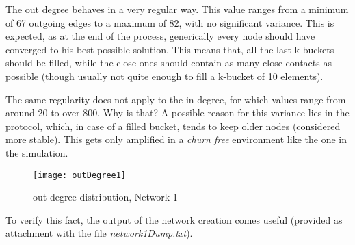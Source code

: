 \documentclass[11pt, a4paper]{report}
\begin{document}
	\par
	The out degree behaves in a very regular way. This value ranges from a minimum of 67 outgoing edges to a maximum of 82, with no significant variance. This is expected, as at the end of the process, generically every node should have converged to his best possible solution. This means that, all the last k-buckets should be filled, while the close ones should contain as many close contacts as possible (though usually not quite enough to fill a k-bucket of 10 elements).
	\par
	The same regularity does not apply to the in-degree, for which values range from around 20 to over 800. Why is that? A possible reason for this variance lies in the protocol, which, in case of a filled bucket, tends to keep older nodes (considered more stable). This gets only amplified in a \emph{churn free} environment like the one in the simulation.
	\begin{figure}[H]
		\centering
		\texttt{[image: outDegree1]}
		\caption{out-degree distribution, Network 1}
		\label{fig:outDegree1}
	\end{figure}
	To verify this fact, the output of the network creation comes useful (provided as attachment with the file \emph{network1Dump.txt}). 
\end{document}
